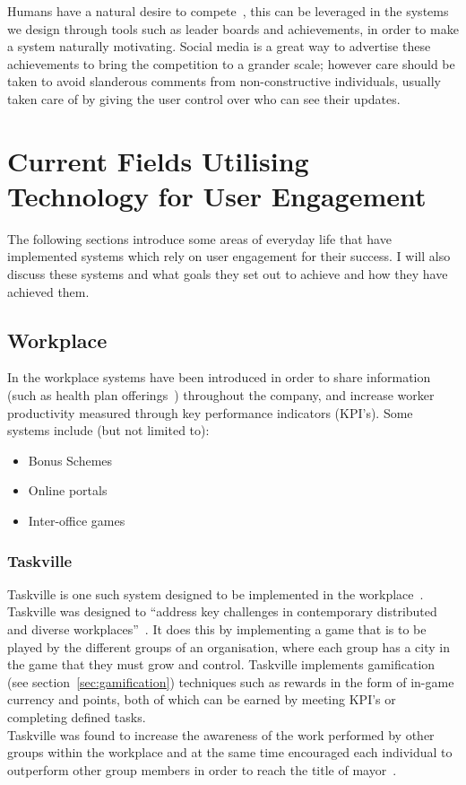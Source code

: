 \documentclass[a4paper,12pt]{article}
\begin{document}
\par
Humans have a natural desire to compete~\citep{bread-and-games}, this can be leveraged in the systems we design through tools such as leader boards and achievements, in order to make a system naturally motivating.
Social media is a great way to advertise these achievements to bring the competition to a grander scale; however care should be taken to avoid slanderous comments from non-constructive individuals, usually taken care of by giving the user control over who can see their updates.

\section{Current Fields Utilising Technology for User Engagement}\label{sec:current-fields}
The following sections introduce some areas of everyday life that have implemented systems which rely on user engagement for their success. 
I will also discuss these systems and what goals they set out to achieve and how they have achieved them.

\subsection{Workplace}

In the workplace systems have been introduced in order to share information (such as health plan offerings~\citep{taxonomy-of-gamification})  throughout the company, and increase worker productivity measured through key performance indicators (KPI's).
Some systems include (but not limited to):
\begin{itemize}
	\item{Bonus Schemes}
	\item{Online portals~\citep{taxonomy-of-gamification}}
	\item{Inter-office games~\citep{taskville}}
\end{itemize}

\subsubsection{Taskville}\label{sec:taskville}
Taskville is one such system designed to be implemented in the workplace~\citep{taskville}. Taskville was designed to ``address key challenges in contemporary distributed and diverse workplaces''~\citep[p.~4]{taskville}. 
It does this by implementing a game that is to be played by the different groups of an organisation, where each group  has a city in the game that they must grow and control. 
Taskville implements gamification (see section~\ref{sec:gamification}) techniques such as rewards in the form of in-game currency and points, both of which can be earned by meeting KPI's or completing defined tasks.\\ 
Taskville was found to increase the awareness of the work performed by other groups within the workplace and at the same time encouraged each individual to outperform other group members in order to reach the title of mayor~\citep{taskville}.
\end{document}
